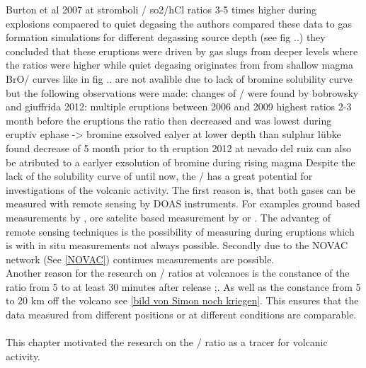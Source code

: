 \documentclass  [
  paper    = a4,
  BCOR     = 10mm,
  twoside,
  fontsize = 12pt,
  fleqn,
  toc      = bibnumbered,
  toc      = listofnumbered,
  numbers  = noendperiod,
  headings = normal,
  listof   = leveldown,
  version  = 3.03
]                                       {scrreprt}
\begin{document}
	Burton et al 2007 at stromboli  /  so2/hCl ratios 3-5 times higher during explosions  compaered to quiet degasing
	the authors compared these data to gas formation simulations for different degassing source depth (see fig ..) they concluded that these eruptions were driven by gas slugs from deeper levels where the ratios were higher while quiet degasing originates from from shallow magma
	BrO/  curves like in fig .. are not avalible due to lack of  bromine solubility curve but the following observations were made:
	changes of /  were found by bobrowsky and giuffrida 2012: multiple eruptions between 2006 and 2009 highest ratios 2-3 month before the eruptions the ratio then decreased and was lowest during eruptiv ephase -> bromine exsolved ealyer at lower depth than sulphur 
	lübke found decrease of   5 month prior to th eruption 2012 at nevado del ruiz can also be atributed to a earlyer exsolution of bromine during rising magma
	Despite the lack of the solubility curve of   until now, the /  has a great potential for investigations of the volcanic activity. The first reason is, that both gases can be measured with remote sensing by DOAS instruments. For examples ground based measurements by \cite{bobrowski2007reactive}, \cite{lubcke2014optical} ore satelite based measurement by \cite{Hörman et al 2013} or \cite{Beirle at al 2014}. The advanteg of remote sensing techniques is the possibility of measuring during eruptions which is with in situ measurements not always possible.
	Secondly due to the NOVAC network (See \ref{NOVAC}) continues measurements are possible.\\
	Another reason for the research on /  ratios at volcanoes is the constance of the ratio from 5 to at least 30 minutes after release \citep{bobrowski2007reactive};\citep{lubcke2014optical}. As well as the constance from 5 to 20 km off the volcano see \ref{bild von Simon noch kriegen}. This ensures that the data measured from different positions or at different conditions are comparable.\\
	\\
	This chapter motivated the research on the /  ratio as a tracer for volcanic activity.
	
	
	
	
	
	
	
	
	
	
	
	
	
\end{document}
